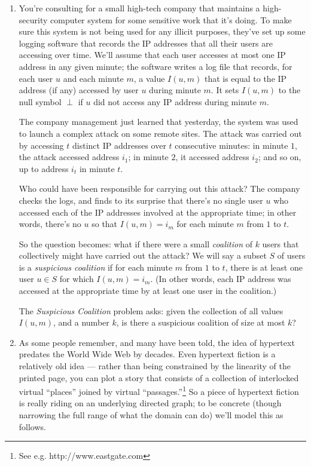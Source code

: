 \documentclass[12pt]{article}
\begin{document}
\begin{enumerate}
\item

You're consulting for a small high-tech company that
maintains a high-security computer system for some
sensitive work that it's doing.
To make sure this system is not being used
for any illicit purposes, they've set up some logging
software that records the IP addresses that all their
users are accessing over time.
We'll assume that each user accesses at most one
IP address in any given minute;
the software writes a log file that records,
for each user $u$ and each minute $m$,
a value $I(u,m)$ that is equal to the IP address (if any)
accessed by user $u$ during minute $m$.
It sets $I(u,m)$ to the null symbol $\perp$
if $u$ did not access any IP address during minute $m$.

The company management just learned that yesterday, the system was used
to launch a complex attack on some remote sites.
The attack was carried out by accessing $t$ distinct
IP addresses over $t$ consecutive minutes:
in minute $1$, the attack accessed address $i_1$;
in minute $2$, it accessed address $i_2$;
and so on, up to address $i_t$ in minute $t$.

Who could have been responsible for carrying out this attack?
The company checks the logs, and finds to its surprise that
there's no single user $u$ who accessed each of the
IP addresses involved at the appropriate time;
in other words, there's no $u$ so that $I(u,m) = i_m$
for each minute $m$ from $1$ to $t$.

So the question becomes: what if there were a small
{\em coalition} of $k$ users that collectively might
have carried out the attack?
We will say a subset $S$ of users is a {\em suspicious coalition}
if for each minute $m$ from $1$ to $t$,
there is at least one user $u \in S$ for which $I(u,m) = i_m$.
(In other words, each IP address was accessed at the appropriate
time by at least one user in the coalition.)

The {\em Suspicious Coalition} problem asks:
given the collection of all values $I(u,m)$,
and a number $k$,
is there a suspicious coalition of size at most $k$?




\item

As some people remember, and many have been told,
the idea of hypertext predates the World Wide Web
by decades.
Even hypertext fiction is a relatively old idea ---
rather than being constrained by the linearity of the printed page,
you can plot a story that consists of a collection
of interlocked virtual ``places''
joined by virtual ``passages.''\footnote{See
e.g. http://www.eastgate.com}
So a piece of hypertext fiction is really riding on
an underlying directed graph; to be concrete
(though narrowing the full range of what the domain can do)
we'll model this as follows.


\end{enumerate}
\end{document}
